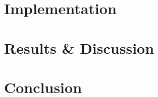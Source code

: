 \documentclass[12pt, twoside,a4paper]{report}
\begin{document}
\chapter{Implementation}


\chapter{Results \& Discussion}


\chapter{Conclusion}



%

\end{document}
